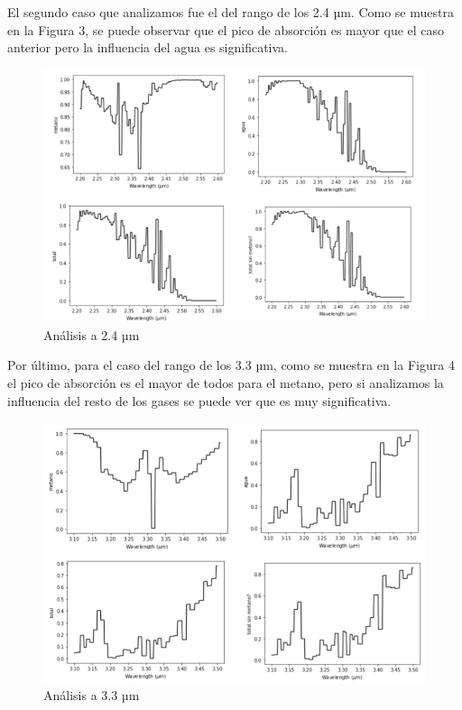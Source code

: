 \documentclass[titlepage,11pt]{article}
\begin{document}
El segundo caso que analizamos fue el del rango de los 2.4 µm. Como se muestra en la Figura 3, se puede observar que el pico de absorción es mayor que el caso anterior pero la influencia del agua es significativa.

\begin{figure}[htb!]
    \centering
    \includegraphics[width=15cm]{fig/analisis24.png}
    \caption{Análisis a 2.4 µm}
    \label{fig:analisis24}
\end{figure}


Por último, para el caso del rango de los 3.3 µm, como se muestra en la Figura 4 el pico de absorción es el mayor de todos para el metano, pero si analizamos la influencia del resto de los gases se puede ver que es muy significativa.
\begin{figure}[htb!]
    \centering
    \includegraphics[width=15cm]{fig/analisis33.png}
    \caption{Análisis a 3.3 µm}
    \label{fig:analisis33}
\end{figure}
\end{document}

